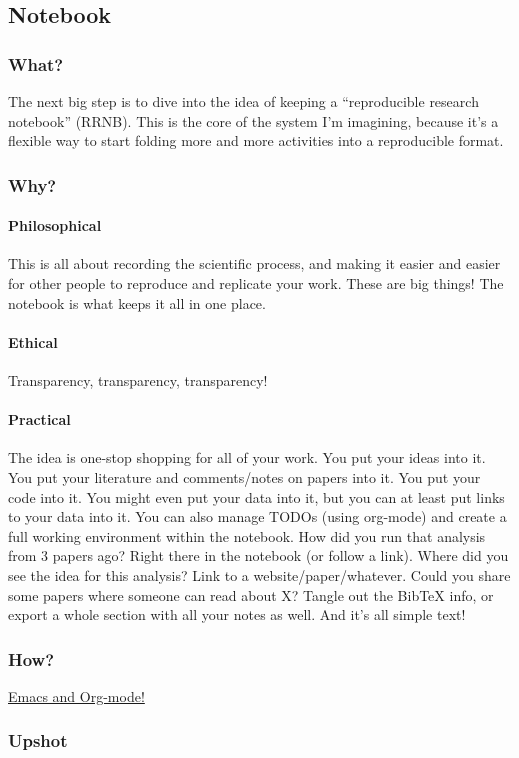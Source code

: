 \documentclass[11pt]{article}
\begin{document}
\subsection{Notebook}
\label{sec-3-2}
\subsubsection{What?}
\label{sec-3-2-1}

The next big step is to dive into the idea of keeping a ``reproducible research notebook'' (RRNB).  This is the core of the system I'm imagining, because it's a flexible way to start folding more and more activities into a reproducible format.
\subsubsection{Why?}
\label{sec-3-2-2}
\paragraph{Philosophical}
\label{sec-3-2-2-1}

This is all about recording the scientific process, and making it easier and easier for other people to reproduce and replicate your work.  These are big things!  The notebook is what keeps it all in one place.
\paragraph{Ethical}
\label{sec-3-2-2-2}

Transparency, transparency, transparency!
\paragraph{Practical}
\label{sec-3-2-2-3}

The idea is one-stop shopping for all of your work.  You put your ideas into it.  You put your literature and comments/notes on papers into it.  You put your code into it.  You might even put your data into it, but you can at least put links to your data into it. You can also manage TODOs (using org-mode) and create a full working environment within the notebook.  How did you run that analysis from 3 papers ago?  Right there in the notebook (or follow a link).  Where did you see the idea for this analysis?  Link to a website/paper/whatever.  Could you share some papers where someone can read about X?  Tangle out the BibTeX info, or export a whole section with all your notes as well. And it's all simple text!
\subsubsection{How?}
\label{sec-3-2-3}

\href{http://orgmode.org/}{Emacs and Org-mode!}
\subsubsection{Upshot}
\label{sec-3-2-4}
\end{document}
